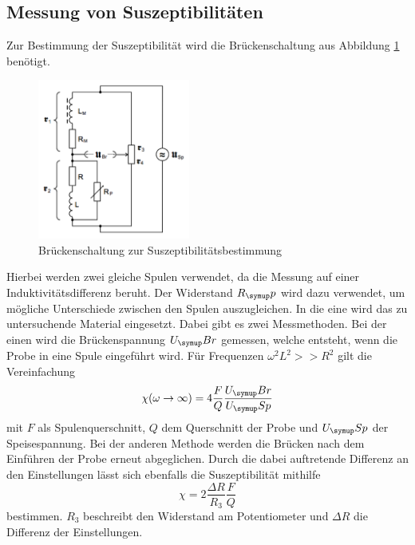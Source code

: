\subsection{Messung von Suszeptibilitäten}
Zur Bestimmung der Suszeptibilität wird die Brückenschaltung aus Abbildung
\ref{fig:schaltung} benötigt.
\begin{figure}
  \centering
  \includegraphics[width=5cm]{bilder/schaltung.png}
  \caption{Brückenschaltung zur Suszeptibilitätsbestimmung \cite{606}}
  \label{fig:schaltung}
\end{figure}
Hierbei werden zwei gleiche Spulen verwendet, da die Messung auf einer
Induktivitätsdifferenz beruht. Der Widerstand $R_\su{p}$ wird dazu verwendet,
um mögliche Unterschiede zwischen den Spulen auszugleichen. In die eine wird das
zu untersuchende
Material eingesetzt. Dabei gibt es zwei Messmethoden. Bei der einen wird die
Brückenspannung $U_\su{Br}$ gemessen, welche entsteht, wenn die Probe in eine
Spule eingeführt wird. Für Frequenzen $\omega^2L^2 >>R^2$ gilt die Vereinfachung
\begin{equation}
 \chi (\omega \to \infty) = 4 \frac{F}{Q}\frac{U_\su{Br}}{U_\su{Sp}}
\end{equation}
mit $F$ als Spulenquerschnitt, $Q$ dem Querschnitt der Probe und $U_\su{Sp}$ der
Speisespannung.
Bei der anderen Methode werden die Brücken nach dem Einführen der Probe erneut
abgeglichen. Durch die dabei auftretende Differenz an den Einstellungen
lässt sich ebenfalls die Suszeptibilität mithilfe
\begin{equation}
 \chi = 2\frac{\Delta R}{R_3}\frac{F}{Q}
 \label{eqn:suszep}
\end{equation}
bestimmen. $R_3$ beschreibt den Widerstand am Potentiometer und $\Delta R$ die
Differenz der Einstellungen.

